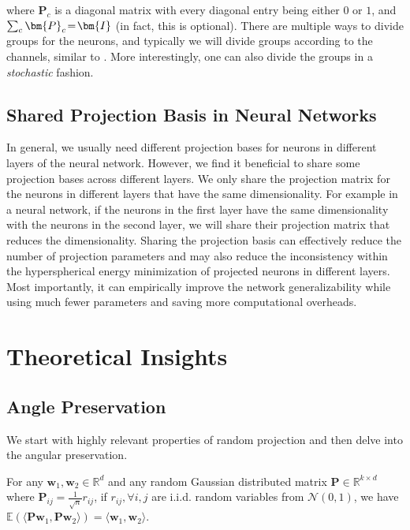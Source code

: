where $\bm{P}_c$ is a diagonal matrix with every diagonal entry being either $0$ or $1$, and $\thickmuskip=2mu \medmuskip=2mu \sum_c\bm{P}_c=\bm{I}$ (in fact, this is optional). There are multiple ways to divide groups for the neurons, and typically we will divide groups according to the channels, similar to \cite{wu2018group}. More interestingly, one can also divide the groups in a \emph{stochastic} fashion.

\subsection{Shared Projection Basis in Neural Networks}

In general, we usually need different projection bases for neurons in different layers of the neural network. However, we find it beneficial to share some projection bases across different layers. We only share the projection matrix for the neurons in different layers that have the same dimensionality. For example in a neural network, if the neurons in the first layer have the same dimensionality with the neurons in the second layer, we will share their projection matrix that reduces the dimensionality. Sharing the projection basis can effectively reduce the number of projection parameters and may also reduce the inconsistency within the hyperspherical energy minimization of projected neurons in different layers. Most importantly, it can empirically improve the network generalizability while using much fewer parameters and saving more computational overheads.

\section{Theoretical Insights}

\subsection{Angle Preservation}

We start with highly relevant properties of random projection and then delve into the angular preservation.

\begin{lemma}\label{lem1}
For any $\bm{w}_1,\bm{w}_2\in\mathbb{R}^d$ and any random Gaussian distributed matrix $\bm{P}\in\mathbb{R}^{k\times d}$ where $\bm{P}_{ij}=\frac{1}{\sqrt{n}}r_{ij}$, if $r_{ij},\forall i,j$ are i.i.d. random variables from $\mathcal{N}(0,1)$, we have $\mathbb{E}(\langle \bm{P}\bm{w}_1,\bm{P}\bm{w}_2 \rangle)=\langle \bm{w}_1,\bm{w}_2\rangle$.
\end{lemma}

